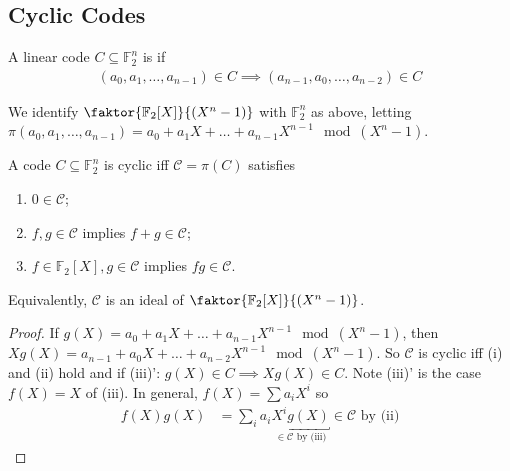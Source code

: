 
\subsection{Cyclic Codes}

\begin{definition}
    A linear code $C \subseteq \mathbb F_2^n$ is  if
    \begin{align*}
        (a_0, a_1, \dots, a_{n-1}) \in C \implies (a_{n-1}, a_0, \dots, a_{n-2}) \in C
    \end{align*}
\end{definition}

We identify $\faktor{\mathbb F_2[X]}{(X^n - 1)}$ with $\mathbb F_2^n$ as above, letting $\pi(a_0, a_1, \dots, a_{n-1}) = a_0 + a_1X + \dots + a_{n-1}X^{n-1} \mod (X^n - 1)$.

\begin{lemma}
    A code $C \subseteq \mathbb F_2^n$ is cyclic iff $\mathcal C = \pi(C)$ satisfies
    \begin{enumerate}
        \item $0 \in \mathcal C$;
        \item $f, g \in \mathcal C$ implies $f + g \in \mathcal C$;
        \item $f \in \mathbb F_2[X], g \in \mathcal C$ implies $fg \in \mathcal C$.
    \end{enumerate}
\end{lemma}

Equivalently, $\mathcal C$ is an ideal of $\faktor{\mathbb F_2[X]}{(X^n - 1)}$.

\begin{proof}
    If $g(X) = a_0 + a_1X + \dots + a_{n-1}X^{n-1} \mod (X^n - 1)$, then $Xg(X) = a_{n-1} + a_0X + \dots + a_{n-2}X^{n-1} \mod (X^n - 1)$.
    So $\mathcal C$ is cyclic iff (i) and (ii) hold and if (iii)': $g(X) \in C \implies Xg(X) \in C$.
    Note (iii)' is the case $f(X) = X$ of (iii).
    In general, $f(X) = \sum a_i X^i$ so
    \begin{align*}
        f(X) g(X) &= \sum_i a_i \underbracket{X^i g(X)}_{\in \mathcal{C} \text{ by (iii)}} \in \mathcal{C} \text{ by (ii)}
    \end{align*}
\end{proof}

